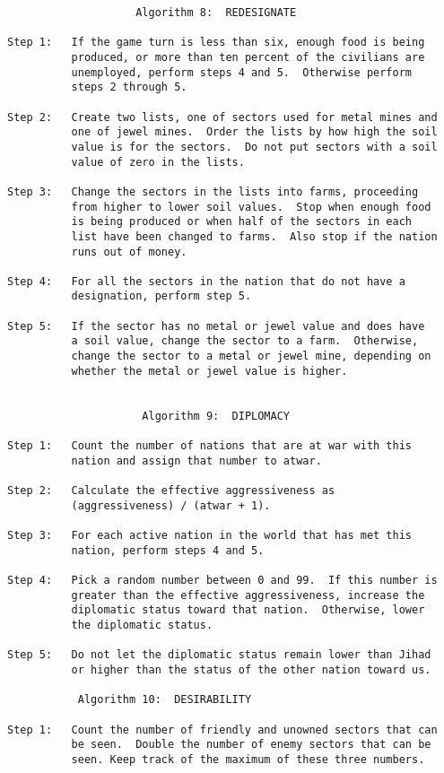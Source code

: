 \begin{verbatim}
                    Algorithm 8:  REDESIGNATE

Step 1:   If the game turn is less than six, enough food is being
          produced, or more than ten percent of the civilians are
          unemployed, perform steps 4 and 5.  Otherwise perform
          steps 2 through 5.

Step 2:   Create two lists, one of sectors used for metal mines and
          one of jewel mines.  Order the lists by how high the soil
          value is for the sectors.  Do not put sectors with a soil
          value of zero in the lists.

Step 3:   Change the sectors in the lists into farms, proceeding
          from higher to lower soil values.  Stop when enough food
          is being produced or when half of the sectors in each
          list have been changed to farms.  Also stop if the nation
          runs out of money.

Step 4:   For all the sectors in the nation that do not have a
          designation, perform step 5.

Step 5:   If the sector has no metal or jewel value and does have
          a soil value, change the sector to a farm.  Otherwise,
          change the sector to a metal or jewel mine, depending on
          whether the metal or jewel value is higher.


                     Algorithm 9:  DIPLOMACY

Step 1:   Count the number of nations that are at war with this
          nation and assign that number to atwar.

Step 2:   Calculate the effective aggressiveness as
          (aggressiveness) / (atwar + 1).

Step 3:   For each active nation in the world that has met this
          nation, perform steps 4 and 5.

Step 4:   Pick a random number between 0 and 99.  If this number is
          greater than the effective aggressiveness, increase the
          diplomatic status toward that nation.  Otherwise, lower
          the diplomatic status.

Step 5:   Do not let the diplomatic status remain lower than Jihad
          or higher than the status of the other nation toward us.

		   Algorithm 10:  DESIRABILITY

Step 1:   Count the number of friendly and unowned sectors that can
          be seen.  Double the number of enemy sectors that can be
          seen. Keep track of the maximum of these three numbers.


\end{verbatim}
